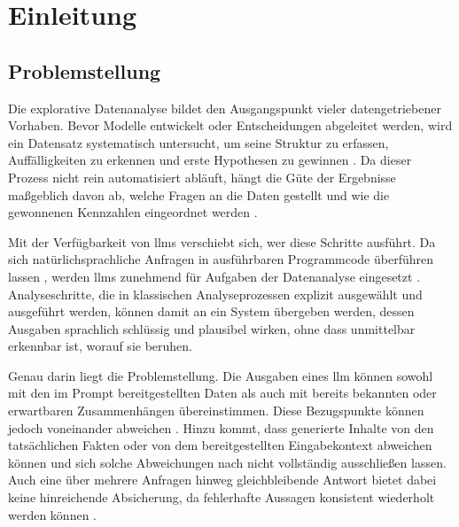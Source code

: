 \chapter{Einleitung}

\section{Problemstellung}

Die explorative Datenanalyse bildet den Ausgangspunkt vieler datengetriebener Vorhaben. Bevor Modelle entwickelt oder Entscheidungen abgeleitet werden, wird ein Datensatz systematisch untersucht, um seine Struktur zu erfassen, Auffälligkeiten zu erkennen und erste Hypothesen zu gewinnen \parencite{rahmany_comparing_2020}. Da dieser Prozess nicht rein automatisiert abläuft, hängt die Güte der Ergebnisse maßgeblich davon ab, welche Fragen an die Daten gestellt und wie die gewonnenen Kennzahlen eingeordnet werden \parencite{langer_towards_2019}.

Mit der Verfügbarkeit von \glspl{llm} verschiebt sich, wer diese Schritte ausführt. Da sich natürlichsprachliche Anfragen in ausführbaren Programmcode überführen lassen \parencite{chen_evaluating_2021}, werden \glspl{llm} zunehmend für Aufgaben der Datenanalyse eingesetzt \parencite{cheng_gpt_2023,li_tapilot-crossing_2024,zhecheva_exploratory_2024}. Analyseschritte, die in klassischen Analyseprozessen explizit ausgewählt und ausgeführt werden, können damit an ein System übergeben werden, dessen Ausgaben sprachlich schlüssig und plausibel wirken, ohne dass unmittelbar erkennbar ist, worauf sie beruhen.

Genau darin liegt die Problemstellung. Die Ausgaben eines \gls{llm} können sowohl mit den im Prompt bereitgestellten Daten als auch mit bereits bekannten oder erwartbaren Zusammenhängen übereinstimmen. Diese Bezugspunkte können jedoch voneinander abweichen \parencite{cheng_understanding_2024}. Hinzu kommt, dass generierte Inhalte von den tatsächlichen Fakten oder von dem bereitgestellten Eingabekontext abweichen können \parencite{bai_hallucination_2025} und sich solche Abweichungen nach \textcite{xu_hallucination_2025} nicht vollständig ausschließen lassen. Auch eine über mehrere Anfragen hinweg gleichbleibende Antwort bietet dabei keine hinreichende Absicherung, da fehlerhafte Aussagen konsistent wiederholt werden können \parencite{zheng_reliable_2024}.

